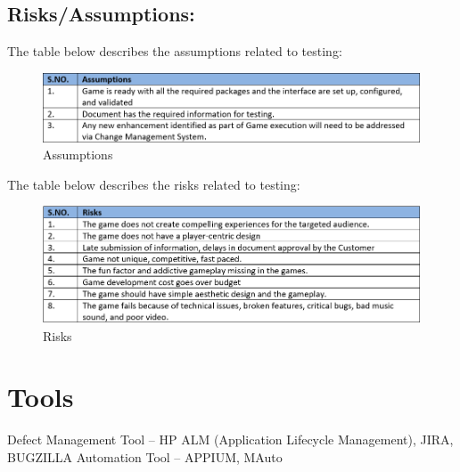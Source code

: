 \documentclass{article}
\begin{document}
\subsection{Risks/Assumptions:}
The table below describes the assumptions related to testing:
\begin{figure}[h]
    \centering
    \includegraphics[scale=0.9]{./images/Assumptions.PNG}
    \caption{Assumptions}
    \label{fig:my_label}
\end{figure}

The table below describes the risks related to testing:
\begin{figure}[h]
    \centering
    \includegraphics[scale=0.9]{./images/Risks.PNG}
    \caption{Risks}
    \label{fig:my_label}
\end{figure}
\newpage

\section{Tools}
Defect Management Tool – HP ALM (Application Lifecycle Management), JIRA, BUGZILLA
Automation Tool – APPIUM, MAuto 

\newpage

\printbibliography
\end{document}
